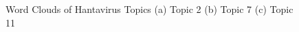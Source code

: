 \documentclass[conference]{IEEEtran}
\begin{document}
\begin{figure}[ht]
\begin{center}
\end{center}
\caption{Word Clouds of Hantavirus Topics (a) Topic 2 (b) Topic 7 (c) Topic 11}
\label{fig:Rare_clouds}
\end{figure}

\begin{figure}[ht]
\begin{center}

\end{center}
\end{figure}
\end{document}
